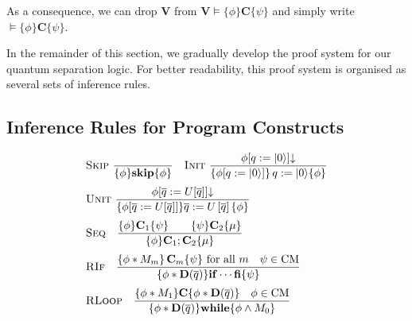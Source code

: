 \documentclass[conference,compsoc, 10pt]{IEEEtran}
\newcommand {\qbar} {{\overline{q}}}
\newcommand {\qI} {{q:=|0\rangle}}
\newcommand {\qU} {{\overline{q}:=U[\overline{q}]}}
\newcommand {\bD} {{\mathbf{D}}}
\newcommand{\Mexist}{{\downarrow}}
\newcommand {\vars } {\mathbf{V}}
\newcommand {\prog } {{\mathbf{C}}}
\newcommand {\perm} {\mathbf{Perm}}
\providecommand{\todo}[1]{{\protect\color{red}\noindent {\bf [todo]}\emph{#1} {\bf [/todo]}}}
\begin{document}
	As a consequence, we can drop $\vars$ from $\vars\models\{\phi\}\prog\{\psi\}$ and simply write $\models\{\phi\}\prog\{\psi\}$. 
	
	In the remainder of this section, we gradually develop the proof system for our quantum separation logic. For better readability, this proof system is organised as several sets of inference rules. 
	
	
	\subsection{Inference Rules for Program Constructs}
	
	
	\begin{figure}\centering
		\begin{equation*}\begin{split}
		&\textsc{Skip}\ \frac{}{\{\phi\}\mathbf{skip}\{\phi\}}\quad 
		\textsc{Init}\ \frac{\phi[\qI]\Mexist}{\left\{\phi[\qI] \right\}\qI\{\phi\}} \\[0.1cm]
		&\textsc{Unit}\ \frac{\phi[\qU]\Mexist}{
			\{\phi[\qU]\}\qbar:=U\left[\qbar\right]\{\phi\}}\\[0.1cm]
		&\textsc{Seq}\quad
		\frac{\{\phi\}\prog_1\{\psi\}\ \ \ \ \ \ \{\psi\}\prog_2\{\mu\}}{\{\phi\}\prog_1;\prog_2\{\mu\}}\\[0.1cm]
		&\textsc{RIf}\quad\frac{\left\{\phi\ast M_m\right\}\prog_m\{\psi\}\ {\rm for\ all}\ m\quad \psi\in \text{CM}}{\{\phi\ast\bD(\qbar)\}\mathbf{if}\cdots\mathbf{fi}\{\psi\}}\\[0.1cm]
		&\textsc{RLoop}\quad\frac{\{\phi\ast M_1\}\prog\{\phi\ast\bD(\qbar)\}\quad\phi\in\text{CM}}{\{\phi\ast\bD(\qbar)\}\mathbf{while}\{\phi\wedge M_0\}} 

\end{split}
\end{equation*}
\end{figure}
\end{document}
